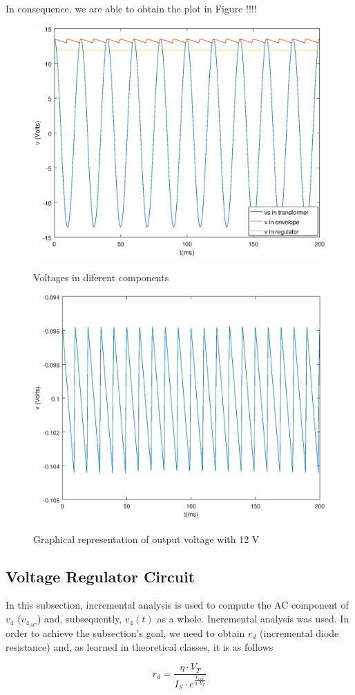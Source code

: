 In consequence, we are able to obtain the plot in Figure !!!!

\begin{figure}[h]
\centering
\caption{Voltages in diferent components}
\includegraphics[width=0.6\linewidth]{V_todas.eps}
\label{plot3}
\end{figure}

\begin{figure}[h]
\centering
\caption{Graphical representation of output voltage with 12 V}
\includegraphics[width=0.6\linewidth]{diferenca.eps}
\label{plot4}
\end{figure}

\subsection{Voltage Regulator Circuit}
\label{subsec:theo_vr}

In this subsection, incremental analysis is used to compute the AC component of $v_4$ ($v_{4_{AC}}$) and, subsequently, $v_4(t)$ as a whole. Incremental analysis was used. In order to achieve the subsection's goal, we need to obtain $r_d$ (incremental diode resistance) and, as learned in theoretical classes, it is as follows

\begin{equation}
    r_d = \frac{\eta \cdot V_T}{I_S \cdot e^{\frac{V_{ON}}{\eta \cdot V_T}}}
    \label{eq:rd}
\end{equation}

